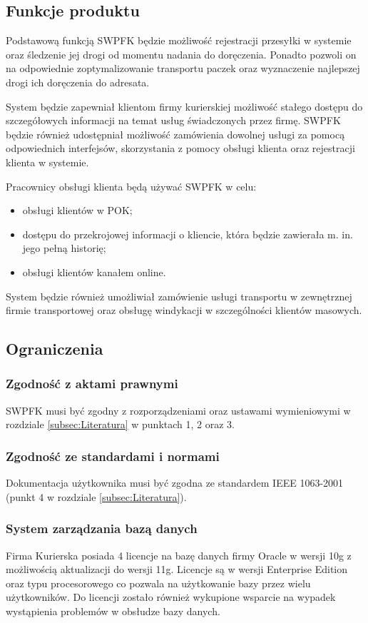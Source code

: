 \subsection{Funkcje produktu}
Podstawową funkcją SWPFK będzie możliwość rejestracji przesyłki w systemie oraz śledzenie jej drogi od momentu nadania do doręczenia. Ponadto pozwoli on na odpowiednie zoptymalizowanie transportu paczek oraz wyznaczenie najlepszej drogi ich doręczenia do adresata.

System będzie zapewniał klientom firmy kurierskiej możliwość stałego dostępu do szczegółowych informacji na temat usług świadczonych przez firmę. SWPFK będzie również udostępniał możliwość zamówienia dowolnej usługi za pomocą odpowiednich interfejsów, skorzystania z pomocy obsługi klienta oraz rejestracji klienta w systemie.

Pracownicy obsługi klienta będą używać SWPFK w celu:
\begin{itemize}
\item obsługi klientów w POK;
\item dostępu do przekrojowej informacji o kliencie, która będzie zawierała m. in. jego pełną historię;
\item obsługi klientów kanałem online.
\end{itemize}

System będzie również umożliwiał zamówienie usługi transportu w zewnętrznej firmie transportowej oraz obsługę windykacji w szczególności klientów masowych.

\subsection{Ograniczenia}

\subsubsection{Zgodność z aktami prawnymi}
SWPFK musi być zgodny z rozporządzeniami oraz ustawami wymieniowymi w rozdziale \ref{subsec:Literatura} w punktach 1, 2 oraz 3.

\subsubsection{Zgodność ze standardami i normami}
Dokumentacja użytkownika musi być zgodna ze standardem IEEE 1063-2001 (punkt 4 w rozdziale \ref{subsec:Literatura}).

\subsubsection{System zarządzania bazą danych}
Firma Kurierska posiada 4 licencje na bazę danych firmy Oracle w wersji 10g z możliwością aktualizacji do wersji 11g. Licencje są w wersji Enterprise Edition oraz typu procesorowego co pozwala na użytkowanie bazy przez wielu użytkowników. Do licencji zostało również wykupione wsparcie na wypadek wystąpienia problemów w obsłudze bazy danych.

